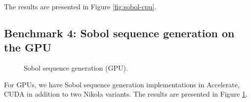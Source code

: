 The results are presented in Figure \ref{fig:sobol-cpu}.

\subsection{Benchmark 4: Sobol sequence generation on the GPU}
\begin{figure}
	\centering
\begin{adjustbox}{minipage=1.3\textwidth,margin=0pt \smallskipamount,center}
\end{adjustbox}
  \caption{Sobol sequence generation (GPU).}
\label{fig:sobol-gpu}
\end{figure}

For GPUs, we have Sobol sequence generation implementations in
Accelerate, CUDA in addition to two Nikola variants. The results are
presented in Figure \ref{fig:sobol-gpu}.

